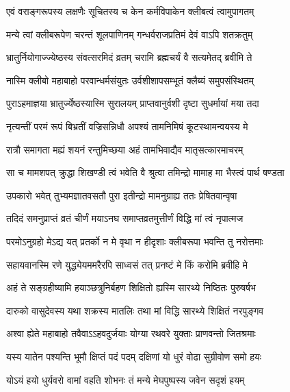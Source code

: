\twolineshloka
{एवं वराङ्गरूपस्य लक्षणैः सूचितस्य च}
{केन कर्मविपाकेन क्लीबत्वं त्वामुपागतम्}


\twolineshloka
{मन्ये त्वां क्लीबरूपेण चरन्तं शूलपाणिनम्}
{गन्धर्वराजप्रतिमं देवं वाऽपि शतक्रतुम्}




\twolineshloka
{भ्रातुर्नियोगाज्ज्येष्ठस्य संवत्सरमिदं व्रतम्}
{चरामि ब्रह्मचर्यं वै सत्यमेतद् ब्रवीमि ते}


\twolineshloka
{नास्मि क्लीबो महाबाहो परवान्धर्मसंयुतः}
{उर्वशीशापसम्भूतं क्लैब्यं समुपसंस्थितम्}


\twolineshloka
{पुराऽहमाज्ञया भ्रातुर्ज्येष्ठस्यास्मि सुरालयम्}
{प्राप्तवानुर्वशी दृष्टा सुधर्मायां मया तदा}


\twolineshloka
{नृत्यन्तीं परमं रूपं बिभ्रतीं वज्रिसन्निधौ}
{अपश्यं तामनिमिषं कूटस्थामन्वयस्य मे}


\twolineshloka
{रात्रौ समागता मह्यं शयनं रन्तुमिच्छया}
{अहं तामभिवाद्यैव मातृसत्कारमाचरम्}


\twolineshloka
{सा च मामशपत् क्रुद्धा शिखण्डी त्वं भवेति वै}
{श्रुत्वा तमिन्द्रो मामाह मा भैस्त्वं पार्थ षण्डता}


\twolineshloka
{उपकारो भवेत् तुभ्यमज्ञातवसतौ पुरा}
{इतीन्द्रो मामनुग्राह्य ततः प्रेषितवान्वृषा}


\twolineshloka
{तदिदं समनुप्राप्तं व्रतं चीर्णं मयाऽनघ}
{समाप्तव्रतमुत्तीर्णं विद्धि मां त्वं नृपात्मज}




\twolineshloka
{परमोऽनुग्रहो मेऽद्य यत् प्रतर्को न मे वृथा}
{न हीदृशाः क्लीबरूपा भवन्ति तु नरोत्तमाः}


\twolineshloka
{सहायवानस्मि रणे युद्ध्येयममरैरपि}
{साध्वसं तत् प्रनष्टं मे किं करोमि ब्रवीहि मे}


\twolineshloka
{अहं ते सङ्ग्रहीष्यामि हयाञ्छत्रुनिर्बहण}
{शिक्षितो ह्यस्मि सारथ्ये निष्ठितः पुरुषर्षभ}


\twolineshloka
{दारुको वासुदेवस्य यथा शक्रस्य मातलिः}
{तथा मां विद्धि सारथ्ये शिक्षितं नरपुङ्गव}


\twolineshloka
{अश्वा ह्येते महाबाहो तवैवाऽऽहवदुर्जयाः}
{योग्या रथवरे युक्ताः प्राणवन्तो जितश्रमाः}


\twolineshloka
{यस्य यातेन पश्यन्ति भूमौ क्षिप्तं पदं पदम्}
{दक्षिणां यो धुरं वोढा सुग्रीवोण समो हयः}


\twolineshloka
{योऽयं हयो धुर्यवरो वामां वहति शोभनः}
{तं मन्ये मेघपुष्पस्य जवेन सदृशं हयम्}


